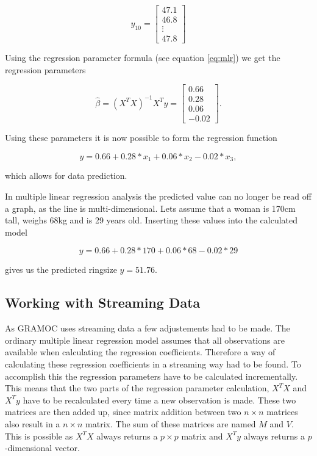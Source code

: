 \begin{equation}
    y_{10} =
    \begin{bmatrix}
        47.1 \\
        46.8 \\
        \vdots \\
        47.8
    \end{bmatrix}
\end{equation}

Using the regression parameter formula (see equation \vref{eq:mlr}) we get the regression parameters

\begin{equation}
    \hat{\beta} = (X^TX)^{-1} X^Ty =
    \begin{bmatrix}
        0.66 \\
        0.28 \\
        0.06 \\
        -0.02
    \end{bmatrix}.
\end{equation}

Using these parameters it is now possible to form the regression function

\begin{equation}
    y = 0.66 + 0.28 * x_1 + 0.06 * x_2 - 0.02 * x_3,
\end{equation}

which allows for data prediction.

In multiple linear regression analysis the predicted value can no longer be read off a graph, as the line is multi-dimensional. Lets assume that a woman is 170cm tall, weighs 68kg and is 29 years old. Inserting these values into the calculated model

\begin{equation}
    y = 0.66 + 0.28 * 170 + 0.06 * 68 - 0.02 * 29
\end{equation}

gives us the predicted ringsize $ y = 51.76 $.

\subsection{Working with Streaming Data}
\label{subsec:mlr_streamingdata}

As GRAMOC uses streaming data a few adjustements had to be made. The ordinary multiple linear regression model assumes that all observations are available when calculating the regression coefficients. Therefore a way of calculating these regression coefficients in a streaming way had to be found. To accomplish this the regression parameters have to be calculated incrementally. This means that the two parts of the regression parameter calculation, $ X^T X $ and $ X^T y $ have to be recalculated every time a new observation is made. These two matrices are then added up, since matrix addition between two $ n \times n$ matrices also result in a $ n \times n$ matrix. The sum of these matrices are named $ M $ and $ V $. This is possible as $ X^T X $ always returns a $ p \times p $ matrix and $ X^T y $ always returns a $ p $-dimensional vector.

